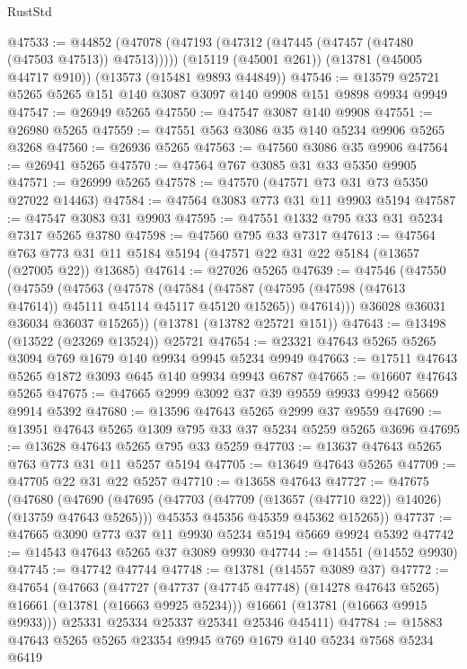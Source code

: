 \begin{lexlean}{RustStd}
\begin{coremodule}
@47533 := @44852
    (@47078 (@47193 (@47312 (@47445 (@47457 (@47480 (@47503 @47513)) @47513)))))
    (@15119 (@45001 @261))
    (@13781 (@45005 @44717 @910))
    (@13573 (@15481 @9893 @44849))
@47546 := @13579 @25721 @5265 @5265 @151 @140 @3087 @3097 @140 @9908 @151 @9898 @9934 @9949
@47547 := @26949 @5265
@47550 := @47547 @3087 @140 @9908
@47551 := @26980 @5265
@47559 := @47551 @563 @3086 @35 @140 @5234 @9906 @5265 @3268
@47560 := @26936 @5265
@47563 := @47560 @3086 @35 @9906
@47564 := @26941 @5265
@47570 := @47564 @767 @3085 @31 @33 @5350 @9905
@47571 := @26999 @5265
@47578 := @47570 (@47571 @73 @31 @73 @5350 @27022 @14463)
@47584 := @47564 @3083 @773 @31 @11 @9903 @5194
@47587 := @47547 @3083 @31 @9903
@47595 := @47551 @1332 @795 @33 @31 @5234 @7317 @5265 @3780
@47598 := @47560 @795 @33 @7317
@47613 := @47564
    @763
    @773
    @31
    @11
    @5184
    @5194
    (@47571 @22 @31 @22 @5184 (@13657 (@27005 @22)) @13685)
@47614 := @27026 @5265
@47639 := @47546
    (@47550
      (@47559
        (@47563
          (@47578
            (@47584
              (@47587 (@47595 (@47598 (@47613 @47614)) @45111 @45114 @45117 @45120 @15265))
              @47614)))
        @36028
        @36031
        @36034
        @36037
        @15265))
    (@13781 (@13782 @25721 @151))
@47643 := @13498 (@13522 (@23269 @13524)) @25721
@47654 := @23321 @47643 @5265 @5265 @3094 @769 @1679 @140 @9934 @9945 @5234 @9949
@47663 := @17511 @47643 @5265 @1872 @3093 @645 @140 @9934 @9943 @6787
@47665 := @16607 @47643 @5265
@47675 := @47665 @2999 @3092 @37 @39 @9559 @9933 @9942 @5669 @9914 @5392
@47680 := @13596 @47643 @5265 @2999 @37 @9559
@47690 := @13951 @47643 @5265 @1309 @795 @33 @37 @5234 @5259 @5265 @3696
@47695 := @13628 @47643 @5265 @795 @33 @5259
@47703 := @13637 @47643 @5265 @763 @773 @31 @11 @5257 @5194
@47705 := @13649 @47643 @5265
@47709 := @47705 @22 @31 @22 @5257
@47710 := @13658 @47643
@47727 := @47675
    (@47680
      (@47690
        (@47695 (@47703 (@47709 (@13657 (@47710 @22)) @14026) (@13759 @47643 @5265)))
        @45353
        @45356
        @45359
        @45362
        @15265))
@47737 := @47665 @3090 @773 @37 @11 @9930 @5234 @5194 @5669 @9924 @5392
@47742 := @14543 @47643 @5265 @37 @3089 @9930
@47744 := @14551 (@14552 @9930)
@47745 := @47742 @47744
@47748 := @13781 (@14557 @3089 @37)
@47772 := @47654
    (@47663
      (@47727
        (@47737 (@47745 @47748) (@14278 @47643 @5265) @16661 (@13781 (@16663 @9925 @5234)))
        @16661
        (@13781 (@16663 @9915 @9933)))
      @25331
      @25334
      @25337
      @25341
      @25346
      @45411)
@47784 := @15883 @47643 @5265 @5265 @23354 @9945 @769 @1679 @140 @5234 @7568 @5234 @6419

\end{coremodule}
\end{lexlean}
